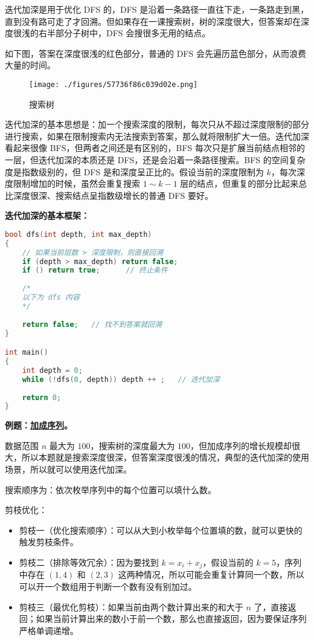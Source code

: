 

迭代加深是用于优化 DFS 的，DFS 是沿着一条路径一直往下走，一条路走到黑，直到没有路可走了才回溯。但如果存在一课搜索树，树的深度很大，但答案却在深度很浅的右半部分子树中，DFS 会搜很多无用的结点。

如下图，答案在深度很浅的红色部分，普通的 DFS 会先遍历蓝色部分，从而浪费大量的时间。

\begin{figure}[ht]
\centering
\texttt{[image: ./figures/57736f86c039d02e.png]}
\caption{搜索树} \label{fig_ID_1}
\end{figure}

迭代加深的基本思想是：加一个搜索深度的限制，每次只从不超过深度限制的部分进行搜索，如果在限制搜索内无法搜索到答案，那么就将限制扩大一倍。迭代加深看起来很像 BFS，但两者之间还是有区别的，BFS 每次只是扩展当前结点相邻的一层，但迭代加深的本质还是 DFS，还是会沿着一条路径搜索。BFS 的空间复杂度是指数级别的，但 DFS 是和深度呈正比的。假设当前的深度限制为 $k$，每次深度限制增加的时候，虽然会重复搜索 $1 \sim k - 1$ 层的结点，但重复的部分比起来总比深度很深、搜索结点呈指数级增长的普通 DFS 要好。

\textbf{迭代加深的基本框架：}
\begin{lstlisting}[language=cpp]
bool dfs(int depth, int max_depth)  
{
    // 如果当前层数 > 深度限制，则直接回溯
    if (depth > max_depth) return false; 
    if () return true;      // 终止条件
    
    /*
    以下为 dfs 内容
    */
    
    return false;   // 找不到答案就回溯
}

int main()
{
    int depth = 0;
    while (!dfs(0, depth)) depth ++ ;   // 迭代加深
    
    return 0;
}
\end{lstlisting}

\textbf{例题：\href{http://poj.org/problem?id=2248}{加成序列}。}

数据范围 $n$ 最大为 $100$，搜索树的深度最大为 $100$，但加成序列的增长规模却很大，所以本题就是搜索深度很深，但答案深度很浅的情况，典型的迭代加深的使用场景，所以就可以使用迭代加深。

搜索顺序为：依次枚举序列中的每个位置可以填什么数。

剪枝优化：
\begin{itemize}
\item 剪枝一（优化搜索顺序）：可以从大到小枚举每个位置填的数，就可以更快的触发剪枝条件。
\item 剪枝二（排除等效冗余）：因为要找到 $k = x_i + x_j$，假设当前的 $k = 5$，序列中存在 $(1, 4)$ 和 $(2, 3)$ 这两种情况，所以可能会重复计算同一个数，所以可以开一个数组用于判断一个数有没有别加过。
\item 剪枝三（最优化剪枝）：如果当前由两个数计算出来的和大于 $n$ 了，直接返回；如果当前计算出来的数小于前一个数，那么也直接返回，因为要保证序列严格单调递增。
\end{itemize}

